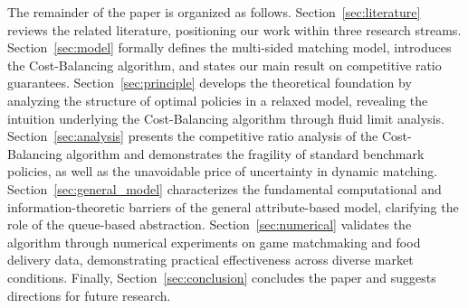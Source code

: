 The remainder of the paper is organized as follows.
Section~\ref{sec:literature} reviews the related literature, positioning our work within three research streams.
Section~\ref{sec:model} formally defines the multi-sided matching model, introduces the Cost-Balancing algorithm, and states our main result on competitive ratio guarantees.
Section~\ref{sec:principle} develops the theoretical foundation by analyzing the structure of optimal policies in a relaxed model, revealing the intuition underlying the Cost-Balancing algorithm through fluid limit analysis.
Section~\ref{sec:analysis} presents the competitive ratio analysis of the Cost-Balancing algorithm and demonstrates the fragility of standard benchmark policies, as well as the unavoidable price of uncertainty in dynamic matching.
Section~\ref{sec:general_model} characterizes the fundamental computational and information-theoretic barriers of the general attribute-based model, clarifying the role of the queue-based abstraction.
Section~\ref{sec:numerical} validates the algorithm through numerical experiments on game matchmaking and food delivery data, demonstrating practical effectiveness across diverse market conditions.
Finally, Section~\ref{sec:conclusion} concludes the paper and suggests directions for future research.

%
%
%
%
%
